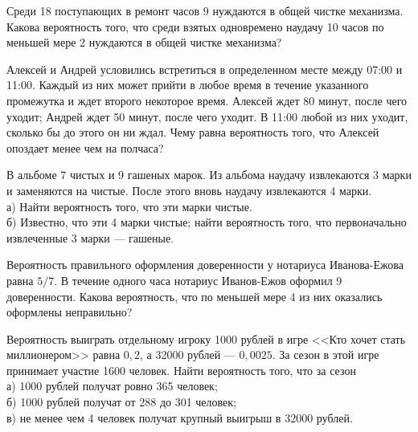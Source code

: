 \newpage\setcounter{zad}{0}



\begin{zkrW}{20}\noindent 
	Среди 18 поступающих в ремонт часов 9 нуждаются в общей чистке механизма. Какова вероятность того, что среди взятых одновремено наудачу 10 часов по меньшей мере 2 нуждаются в общей чистке механизма?
 
\end{zkrW}

\begin{zkrW}{20}\noindent 
	Алексей и Андрей условились встретиться в определенном месте между 07:00 и 11:00. Каждый из них может прийти в любое время в течение указанного промежутка и ждет второго некоторое время. Алексей ждет 80 минут, после чего уходит; Андрей ждет 50 минут, после чего уходит. В 11:00 любой из них уходит, сколько бы до этого он ни ждал. Чему равна вероятность того, что Алексей опоздает менее чем на полчаса?
 
\end{zkrW}

\begin{zkrW}{20}\noindent 
	В альбоме 7 чистых и 9 гашеных марок. Из альбома наудачу извлекаются 3 марки и заменяются на чистые. После этого вновь наудачу извлекаются 4 марки. \\ \indent а) Найти вероятность того, что эти марки чистые. \\ \indent б) Известно, что эти 4 марки чистые; найти вероятность того, что первоначально извлеченные 3 марки --- гашеные.
 
\end{zkrW}

\begin{zkrW}{20}\noindent 
	Вероятность правильного оформления доверенности у нотариуса Иванова-Ежова равна $5/7$. В течение одного часа нотариус Иванов-Ежов оформил 9 доверенности. Какова вероятность, что по меньшей мере 4 из них оказались оформлены неправильно?
 
\end{zkrW}

\begin{zkrW}{20}\noindent 
	Вероятность выиграть отдельному игроку 1000 рублей в игре <<Кто хочет стать миллионером>> равна $0{,}2$, а 32000 рублей --- $0{,}0025$. За сезон в этой игре принимает участие 1600 человек. Найти вероятность того, что за сезон \\ \indent а) 1000 рублей получат ровно 365 человек; \\ \indent б) 1000 рублей получат от 288 до 301 человек; \\ \indent в) не менее чем 4 человек получат крупный выигрыш в 32000 рублей.
 
\end{zkrW}


